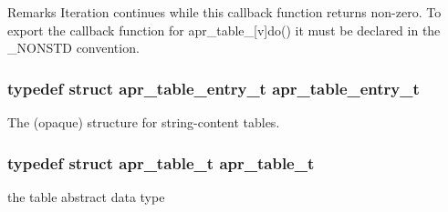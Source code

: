\begin{DoxyRemark}{Remarks}
Iteration continues while this callback function returns non-\/zero. To export the callback function for apr\-\_\-table\-\_\-\mbox{[}v\mbox{]}do() it must be declared in the \-\_\-\-N\-O\-N\-S\-T\-D convention. 
\end{DoxyRemark}
\hypertarget{group__apr__tables_gac7e0151b714e58b75c597dafed75df3f}{
\subsubsection[{apr\-\_\-table\-\_\-entry\-\_\-t}]{\setlength{\rightskip}{0pt plus 5cm}typedef struct {\bf apr\-\_\-table\-\_\-entry\-\_\-t} {\bf apr\-\_\-table\-\_\-entry\-\_\-t}}}\label{group__apr__tables_gac7e0151b714e58b75c597dafed75df3f}
The (opaque) structure for string-\/content tables. \hypertarget{group__apr__tables_gad7ea82d6608a4a633fc3775694ab71e4}{
\subsubsection[{apr\-\_\-table\-\_\-t}]{\setlength{\rightskip}{0pt plus 5cm}typedef struct {\bf apr\-\_\-table\-\_\-t} {\bf apr\-\_\-table\-\_\-t}}}\label{group__apr__tables_gad7ea82d6608a4a633fc3775694ab71e4}
the table abstract data type 

